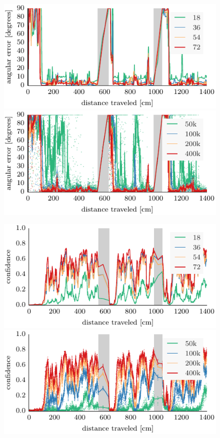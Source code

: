 \documentclass[letterpaper, 10pt, conference]{ieeeconf}
\begin{document}
\begin{figure}
\includegraphics{ml-whole_random_long-theta} \hfill \includegraphics{mcl-whole_random_long-theta}

\vspace{.2em}

\includegraphics{ml-whole_random_long-conf} \hfill \includegraphics{mcl-whole_random_long-conf}


\end{figure}
\end{document}
